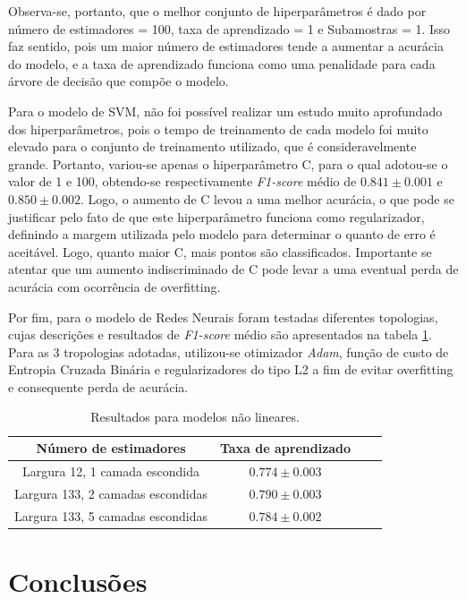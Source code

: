 \documentclass{homework}
\begin{document}
Observa-se, portanto, que o melhor conjunto de hiperparâmetros é dado por número de estimadores = 100, taxa de
aprendizado = 1 e Subamostras = 1. Isso faz sentido, pois um maior número de estimadores tende a aumentar a acurácia do
modelo, e a taxa de aprendizado funciona como uma penalidade para cada árvore de decisão que compõe o modelo.

Para o modelo de SVM, não foi possível realizar um estudo muito aprofundado dos hiperparâmetros, pois o tempo de
treinamento de cada modelo foi muito elevado para o conjunto de treinamento utilizado, que é consideravelmente grande.
Portanto, variou-se apenas o hiperparâmetro C, para o qual adotou-se o valor de 1 e 100, obtendo-se respectivamente
\textit{F1-score} médio de $0.841 \pm 0.001$ e $0.850 \pm 0.002$. Logo, o aumento de C levou a uma melhor acurácia, o
que pode se justificar pelo fato de que este hiperparâmetro funciona como regularizador, definindo a margem utilizada
pelo modelo para determinar o quanto de erro é aceitável. Logo, quanto maior C, mais pontos são classificados.
Importante se atentar que um aumento indiscriminado de C pode levar a uma eventual perda de acurácia com ocorrência de
overfitting.

Por fim, para o modelo de Redes Neurais foram testadas diferentes topologias, cujas descrições e resultados de
\textit{F1-score} médio são apresentados na tabela \ref{nn_topology}. Para as 3 tropologias adotadas, utilizou-se
otimizador \textit{Adam}, função de custo de Entropia Cruzada Binária e regularizadores do tipo L2 a fim de evitar
overfitting e consequente perda de acurácia.

\begin{table}[h!]
    \centering
    \begin{tabular}{|c|c|c|c|}
        \hline
        \textbf{Número de estimadores} & \textbf{Taxa de aprendizado} \\
        \hline
        Largura 12, 1 camada escondida & $0.774 \pm 0.003$ \\
        \hline
        Largura 133, 2 camadas escondidas & $0.790 \pm 0.003$ \\
        \hline
        Largura 133, 5 camadas escondidas & $0.784 \pm 0.002$ \\
        \hline
    \end{tabular}
    \caption{Resultados para modelos não lineares.}
    \label{nn_topology}
\end{table}

\section{Conclusões}
\end{document}
